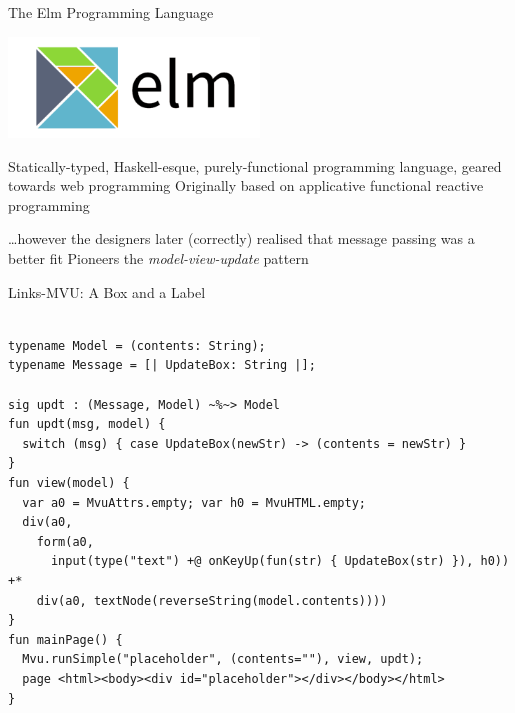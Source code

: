 \documentclass[11.5pt, aspectratio=169]{beamer}
\begin{document}
\begin{frame}{The Elm Programming Language}

  \begin{center}
    \includegraphics[width=0.5\textwidth]{images/ElmLogo.png}
  \end{center}

  \begin{fullpageitemize}
  \itemR Statically-typed, Haskell-esque, purely-functional programming language, geared towards web programming
  \itemR Originally based on applicative functional reactive programming
    \begin{itemize}
      \itemR \ldots however the designers later (correctly) realised that message passing was a better fit
      \itemR Pioneers the \emph{model-view-update} pattern
    \end{itemize}
  \end{fullpageitemize}

\end{frame}

\begin{frame}[fragile]{Links-MVU: A Box and a Label}
\begin{lstlisting}[language=Links]

typename Model = (contents: String);
typename Message = [| UpdateBox: String |];

sig updt : (Message, Model) ~%~> Model
fun updt(msg, model) {
  switch (msg) { case UpdateBox(newStr) -> (contents = newStr) }
}
fun view(model) {
  var a0 = MvuAttrs.empty; var h0 = MvuHTML.empty;
  div(a0,
    form(a0,
      input(type("text") +@ onKeyUp(fun(str) { UpdateBox(str) }), h0)) +*
    div(a0, textNode(reverseString(model.contents))))
}
fun mainPage() {
  Mvu.runSimple("placeholder", (contents=""), view, updt);
  page <html><body><div id="placeholder"></div></body></html>
}
\end{lstlisting}
\end{frame}
\end{document}
